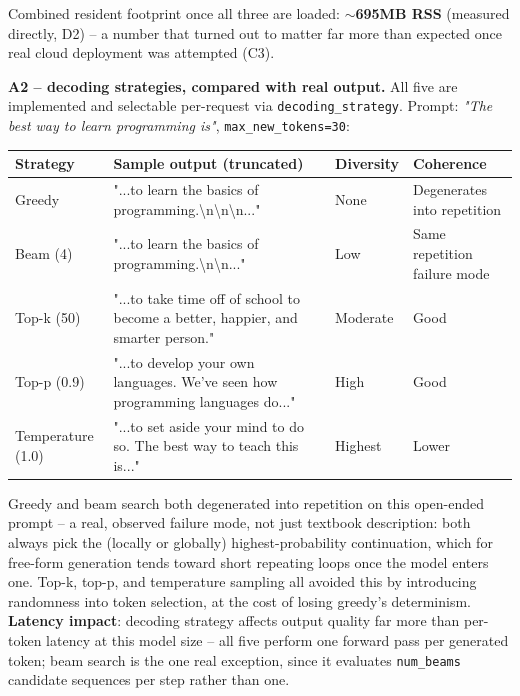 \documentclass[11pt,a4paper]{article}
\begin{document}
Combined resident footprint once all three are loaded: \textbf{$\sim$695MB RSS} (measured
directly, D2) -- a number that turned out to matter far more than expected once real cloud
deployment was attempted (C3).

\textbf{A2 -- decoding strategies, compared with real output.} All five are implemented and
selectable per-request via \texttt{decoding\_strategy}. Prompt: \emph{"The best way to learn
programming is"}, \texttt{max\_new\_tokens=30}:

\begin{table}[H]
\centering
\small
\begin{tabular}{@{}p{2cm}p{6.3cm}p{1.6cm}p{2.5cm}@{}}
\toprule
\textbf{Strategy} & \textbf{Sample output (truncated)} & \textbf{Diversity} & \textbf{Coherence} \\
\midrule
Greedy & "...to learn the basics of programming.\textbackslash n\textbackslash n\textbackslash n..." & None & Degenerates into repetition \\[0.3em]
Beam (4) & "...to learn the basics of programming.\textbackslash n\textbackslash n..." & Low & Same repetition failure mode \\[0.3em]
Top-k (50) & "...to take time off of school to become a better, happier, and smarter person." & Moderate & Good \\[0.3em]
Top-p (0.9) & "...to develop your own languages. We've seen how programming languages do..." & High & Good \\[0.3em]
Temperature (1.0) & "...to set aside your mind to do so. The best way to teach this is..." & Highest & Lower \\
\bottomrule
\end{tabular}
\end{table}

Greedy and beam search both degenerated into repetition on this open-ended prompt -- a real,
observed failure mode, not just textbook description: both always pick the (locally or
globally) highest-probability continuation, which for free-form generation tends toward
short repeating loops once the model enters one. Top-k, top-p, and temperature sampling all
avoided this by introducing randomness into token selection, at the cost of losing greedy's
determinism. \textbf{Latency impact}: decoding strategy affects output quality far more than
per-token latency at this model size -- all five perform one forward pass per generated
token; beam search is the one real exception, since it evaluates \texttt{num\_beams}
candidate sequences per step rather than one.
\end{document}
